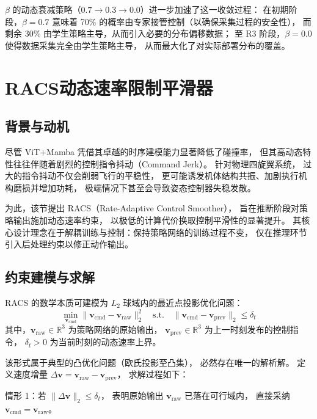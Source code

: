 $\beta$ 的动态衰减策略（$0.7 \rightarrow 0.3 \rightarrow 0.0$）进一步加速了这一收敛过程：
在初期阶段，$\beta=0.7$ 意味着 70\% 的概率由专家接管控制（以确保采集过程的安全性），
而剩余 30\% 由学生策略主导，从而引入必要的分布偏移数据；
至 R3 阶段，$\beta=0.0$ 使得数据采集完全由学生策略主导，
从而最大化了对实际部署分布的覆盖。


\section{RACS动态速率限制平滑器}

\subsection{背景与动机}

尽管 ViT+Mamba 凭借其卓越的时序建模能力显著降低了碰撞率，
但其高动态特性往往伴随着剧烈的控制指令抖动（Command Jerk）。
针对物理四旋翼系统，
过大的指令抖动不仅会削弱飞行的平稳性，
更可能诱发机体结构共振、加剧执行机构磨损并增加功耗，
极端情况下甚至会导致姿态控制器失稳发散\cite{Mellinger2011MinSnapTrajectory}。

为此，该节提出 RACS（Rate-Adaptive Control Smoother），
旨在推断阶段对策略输出施加动态速率约束，
以极低的计算代价换取控制平滑性的显著提升。
其核心设计理念在于解耦训练与控制：保持策略网络的训练过程不变，
仅在推理环节引入后处理约束以修正动作输出。

\subsection{约束建模与求解}

RACS 的数学本质可建模为 $L_2$ 球域内的最近点投影优化问题：
\begin{equation}
  \min_{\mathbf{v}_{\text{cmd}}} \|\mathbf{v}_{\text{cmd}} - \mathbf{v}_{\text{raw}}\|_2^2 \quad \text{s.t.} \quad \|\mathbf{v}_{\text{cmd}} - \mathbf{v}_{\text{prev}}\|_2 \leq \delta_t
  \label{eq:racs_opt}
\end{equation}
其中，$\mathbf{v}_{\text{raw}} \in \mathbb{R}^3$ 为策略网络的原始输出，
$\mathbf{v}_{\text{prev}} \in \mathbb{R}^3$ 为上一时刻发布的控制指令，
$\delta_t > 0$ 为当前时刻的动态速率上界。

该形式属于典型的凸优化问题（欧氏投影至凸集），
必然存在唯一的解析解。
定义速度增量 $\Delta \mathbf{v} = \mathbf{v}_{\text{raw}} - \mathbf{v}_{\text{prev}}$，
求解过程如下：

情形 1：若 $\|\Delta \mathbf{v}\|_2 \leq \delta_t$，
表明原始输出 $\mathbf{v}_{\text{raw}}$ 已落在可行域内，
直接采纳 $\mathbf{v}_{\text{cmd}} = \mathbf{v}_{\text{raw}}$。

